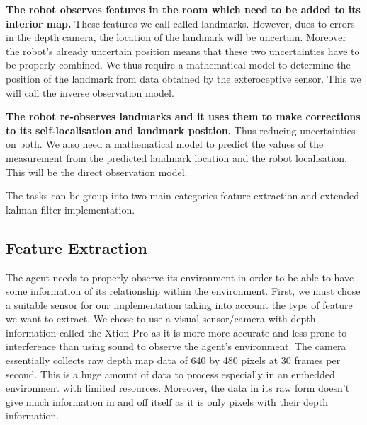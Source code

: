 \documentclass[]{article}
\begin{document}
{\textbf{The robot observes features in the room which need to be added to its interior map.} These features we call called landmarks. However, dues to errors in the depth camera, the location of the landmark will be uncertain. Moreover the robot's already uncertain position means that these two uncertainties have to be properly combined. We thus require a mathematical model to determine the position of the landmark from data obtained by the exteroceptive sensor. This we will call the inverse observation model.

\textbf{The robot re-observes landmarks and it uses them to  make corrections to its self-localisation and landmark position.} Thus reducing uncertainties on both. We also need a mathematical model to predict the values of the measurement from the predicted landmark location and the robot localisation. This will be the direct observation model.

The tasks can be group into two main categories feature extraction and extended kalman filter implementation.

\subsection{Feature Extraction}
The agent needs to properly observe its environment in order to be able to have some information of its relationship within the environment. First, we must chose a suitable sensor for our implementation taking into account the type of feature we want to extract. We chose to use a visual sensor/camera with depth information called the Xtion Pro as it is more more accurate and less prone to interference than using sound to observe the agent's environment. The camera essentially collects raw depth map data of 640 by 480 pixels at 30 frames per second. This is a huge amount of data to process especially in an embedded environment with limited resources. Moreover, the data in its raw form doesn't give much information in and off itself as it is only pixels with their depth information.

}
\end{document}
